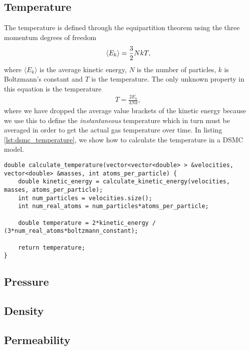\subsection{Temperature}
The temperature is defined through the equipartition theorem using the three momentum degrees of freedom
\begin{align}
	\langle E_k \rangle = {3\over 2}NkT,
\end{align}
where $\langle E_k \rangle$ is the average kinetic energy, $N$ is the number of particles, $k$ is Boltzmann's constant and $T$ is the temperature. The only unknown property in this equation is the temperature
\begin{align}
	T = \frac{2E_k}{3Nk},
\end{align}
where we have dropped the average value brackets of the kinetic energy because we use this to define the \textit{instantaneous} temperature which in turn must be averaged in order to get the actual gas temperature over time. In listing \ref{lst:dsmc_temperature}, we show how to calculate the temperature in a DSMC model.

\begin{lstlisting}[caption=Calculation of instantaneous temperature., label=lst:dsmc_temperature]
double calculate_temperature(vector<vector<double> > &velocities, vector<double> &masses, int atoms_per_particle) {
	double kinetic_energy = calculate_kinetic_energy(velocities, masses, atoms_per_particle);
	int num_particles = velocities.size();
	int num_real_atoms = num_particles*atoms_per_particle;
	
	double temperature = 2*kinetic_energy / (3*num_real_atoms*boltzmann_constant);
	
	return temperature;
}
\end{lstlisting}

\subsection{Pressure}

\subsection{Density}
\subsection{Permeability}